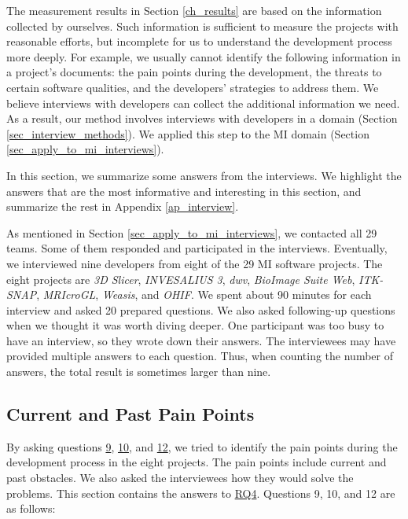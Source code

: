 \documentclass[final, 3p, times, authoryear]{elsarticle}
\begin{document}
The measurement results in Section \ref{ch_results} are based on the information
collected by ourselves. Such information is sufficient to measure the projects
with reasonable efforts, but incomplete for us to understand the development
process more deeply. For example, we usually cannot identify the following
information in a project's documents: the pain points during the development,
the threats to certain software qualities, and the developers' strategies to
address them. We believe interviews with developers can collect the additional
information we need. As a result, our method involves interviews with developers
in a domain (Section \ref{sec_interview_methods}). We applied this step to the
MI domain (Section \ref{sec_apply_to_mi_interviews}).

In this section, we summarize some answers from the interviews. We highlight the
answers that are the most informative and interesting in this section, and
summarize the rest in Appendix \ref{ap_interview}.

As mentioned in Section \ref{sec_apply_to_mi_interviews}, we contacted all 29
teams. Some of them responded and participated in the interviews. Eventually, we
interviewed nine developers from eight of the 29 MI software projects. The eight
projects are \textit{3D Slicer}, \textit{INVESALIUS 3}, \textit{dwv},
\textit{BioImage Suite Web}, \textit{ITK-SNAP}, \textit{MRIcroGL},
\textit{Weasis}, and \textit{OHIF}. We spent about 90 minutes for each interview
and asked 20 prepared questions. We also asked following-up questions when we
thought it was worth diving deeper. One participant was too busy to have an
interview, so they wrote down their answers. The interviewees may have provided
multiple answers to each question. Thus, when counting the number of answers,
the total result is sometimes larger than nine.

\subsection{Current and Past Pain Points} \label{sec_interview_pain_points}

By asking questions \hyperlink{q9}{9}, \hyperlink{q10}{10}, and
\hyperlink{q12}{12}, we tried to identify the pain points during the development
process in the eight projects. The pain points include current and past
obstacles. We also asked the interviewees how they would solve the problems.
This section contains the answers to \hyperlink{rq4}{RQ4}. Questions 9, 10, and
12 are as follows:
\end{document}

